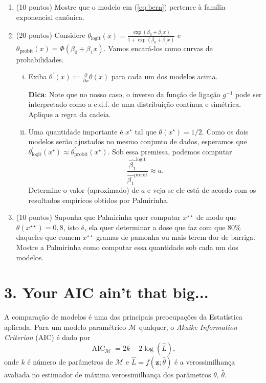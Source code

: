 \documentclass[a4paper,10pt, notitlepage]{report}
\newif\ifanswers
\begin{document}
\begin{enumerate}[label=\alph*)] 
 \item (10 pontos) Mostre que o modelo em (\ref{eq:bern}) pertence à família exponencial canônica.
  \item (20 pontos) Considere $\theta_{\text{logit}}(x) = \frac{\exp\left(\beta_0 + \beta_1 x\right)}{1 + \exp\left(\beta_0 + \beta_1 x\right)}$ e $\theta_{\text{probit}}(x) = \Phi(\beta_0 + \beta_1 x)$. Vamos encará-los como curvas de probabilidades. 
  \begin{enumerate}[i.]
      \item  Exiba $\theta^{\prime}(x) := \frac{\partial}{\partial x}\theta(x)$ para cada um dos modelos acima.
      
      \textbf{Dica}: Note que no nosso caso, o inverso da função de ligação $g^{-1}$ pode ser interpretado como a c.d.f. de uma distribuição contínua e simétrica. 
      Aplique a regra da cadeia.
      \item   Uma quantidade importante é $x^{\star}$ tal que $\theta(x^{\star}) = 1/2$.
      Como os dois modelos serão ajustados no mesmo conjunto de dados, esperamos que $\theta_{\text{logit}}^{\prime}(x^{\star}) \approx \theta_{\text{probit}}^{\prime}(x^{\star})$.
     Sob essa premissa, podemos computar
      \begin{equation*}
          \frac{\hat{\beta_1}^{\text{logit}}}{\hat{\beta_1}^{\text{probit}}} \approx a.
      \end{equation*}
      Determine o valor (aproximado) de $a$ e veja se ele está de acordo com os resultados empíricos obtidos por Palmirinha.
  \end{enumerate}
  \item (10 pontos) Suponha que Palmirinha quer computar $x^{\star\star}$ de modo que $\theta(x^{\star\star}) = 0,8$, isto é, ela quer determinar a dose que faz com que 80\% daqueles que comem $x^{\star\star}$ gramas de pamonha ou mais terem dor de barriga.
  Mostre a Palmirinha como computar essa quantidade sob cada um dos modelos.
\end{enumerate} 
\ifanswers

\fi

\section*{3. Your AIC ain't that big...}

A comparação de modelos é uma das principais preocupações da Estatística aplicada. 
Para um modelo paramétrico $\mathcal{M}$ qualquer, o \textit{Akaike Information Criterion} (AIC) é dado por
\begin{equation*}
    \operatorname{AIC}_{\mathcal{M}} = 2k - 2\log(\hat{L}),
\end{equation*}
onde $k$ é número de parâmetros de $\mathcal{M}$ e $\hat{L} = f(\boldsymbol{z} ; \hat{\theta})$ é a verossimilhança avaliada no estimador de máxima verossimilhança dos parâmetros $\theta$, $\hat{\theta}$.
\end{document}
